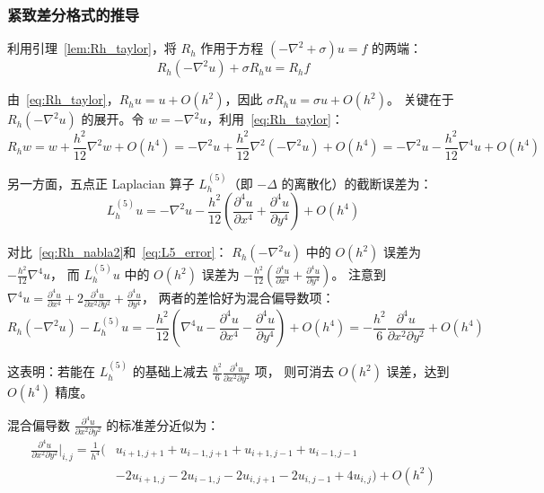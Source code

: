 \subsubsection{紧致差分格式的推导}

利用引理~\ref{lem:Rh_taylor}，将 $R_h$ 作用于方程 $(-\nabla^2 + \sigma)u = f$ 的两端：
\begin{equation}
  R_h(-\nabla^2 u) + \sigma R_h u = R_h f
  \label{eq:Rh_apply}
\end{equation}

由~\eqref{eq:Rh_taylor}，$R_h u = u + O(h^2)$，因此 $\sigma R_h u = \sigma u + O(h^2)$。
关键在于 $R_h(-\nabla^2 u)$ 的展开。令 $w = -\nabla^2 u$，利用~\eqref{eq:Rh_taylor}：
\begin{equation}
  R_h w = w + \frac{h^2}{12}\nabla^2 w + O(h^4)
  = -\nabla^2 u + \frac{h^2}{12}\nabla^2(-\nabla^2 u) + O(h^4)
  = -\nabla^2 u - \frac{h^2}{12}\nabla^4 u + O(h^4)
  \label{eq:Rh_nabla2}
\end{equation}

另一方面，五点正 Laplacian 算子 $L_h^{(5)}$（即 $-\Delta$ 的离散化）的截断误差为：
\begin{equation}
  L_h^{(5)} u = -\nabla^2 u
  - \frac{h^2}{12}\left(\frac{\partial^4 u}{\partial x^4} + \frac{\partial^4 u}{\partial y^4}\right) + O(h^4)
  \label{eq:L5_error}
\end{equation}

对比~\eqref{eq:Rh_nabla2}和~\eqref{eq:L5_error}：
$R_h(-\nabla^2 u)$ 中的 $O(h^2)$ 误差为 $-\frac{h^2}{12}\nabla^4 u$，
而 $L_h^{(5)} u$ 中的 $O(h^2)$ 误差为 $-\frac{h^2}{12}(\frac{\partial^4 u}{\partial x^4} + \frac{\partial^4 u}{\partial y^4})$。
注意到 $\nabla^4 u = \frac{\partial^4 u}{\partial x^4} + 2\frac{\partial^4 u}{\partial x^2 \partial y^2} + \frac{\partial^4 u}{\partial y^4}$，
两者的差恰好为混合偏导数项：
\begin{equation}
  R_h(-\nabla^2 u) - L_h^{(5)} u = -\frac{h^2}{12}\left(\nabla^4 u
  - \frac{\partial^4 u}{\partial x^4} - \frac{\partial^4 u}{\partial y^4}\right) + O(h^4)
  = -\frac{h^2}{6}\frac{\partial^4 u}{\partial x^2 \partial y^2} + O(h^4)
  \label{eq:diff_Rh_L5}
\end{equation}

这表明：若能在 $L_h^{(5)}$ 的基础上减去 $\frac{h^2}{6}\frac{\partial^4 u}{\partial x^2 \partial y^2}$ 项，
则可消去 $O(h^2)$ 误差，达到 $O(h^4)$ 精度。

混合偏导数 $\frac{\partial^4 u}{\partial x^2 \partial y^2}$ 的标准差分近似为：
\begin{equation}
  \begin{aligned}
  \frac{\partial^4 u}{\partial x^2 \partial y^2}\bigg|_{i,j}
  = \frac{1}{h^4}\big(&u_{i+1,j+1} + u_{i-1,j+1}
  + u_{i+1,j-1} + u_{i-1,j-1} \\
  &- 2u_{i+1,j} - 2u_{i-1,j}
  - 2u_{i,j+1} - 2u_{i,j-1} + 4u_{i,j}\big)
  + O(h^2)
  \end{aligned}
  \label{eq:mixed_deriv}
\end{equation}

